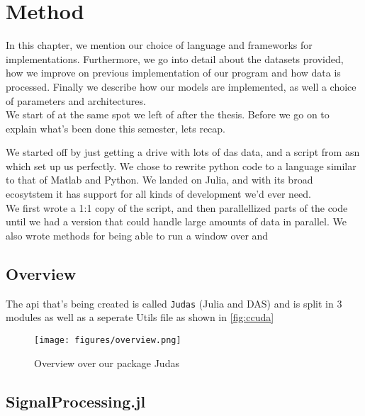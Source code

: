 \chapter{Method}
\label{chap:method}

In this chapter, we mention our choice of language and frameworks for implementations. Furthermore, we go into detail about the datasets provided, how we improve on previous implementation of our program and how data is processed. Finally we describe how our models are implemented, as well a choice of parameters and architectures. \\



We start of at the same spot we left of after the thesis. Before we go on to explain what's been done this semester, lets recap. 

We started off by just getting a drive with lots of \acrshort{das} data, and a script from \acrfull{asn} which set up us perfectly. We chose to rewrite python code to a language similar to that of Matlab and Python. We landed on Julia, and with its broad ecosytstem it has support for all kinds of development we'd ever need. \\

We first wrote a 1:1 copy of the script, and then parallellized parts of the code until we had a version that could handle large amounts of data in parallel. We also wrote methods for being able to run a window over and \\ 


\section{Overview}

The \acrshort{api} that's being created is called \texttt{Judas} (Julia and DAS) and is split in 3 modules as well as a seperate Utils file as shown in \ref{fig:ccuda}

\begin{figure}[h]
    \centering
    \texttt{[image: figures/overview.png]}
    \caption{Overview over our package Judas}
    \label{fig:judasoverview}
\end{figure}








\section{SignalProcessing.jl}

